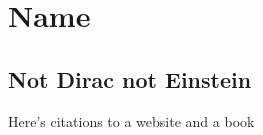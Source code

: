 \documentclass[main.tex]{subfiles}
\begin{document}
\ifsubbuild
\setcounter{section}{4}
\section{Name}
\fi


\subsection{Not Dirac not Einstein} 

Here's citations to a website \cite{knuthwebsite} and a book \cite{knuth-fa}

\ifsubbuild
\printbibliography[segment=\therefsegment, heading=subbibliography] %
\fi 
\end{document}
